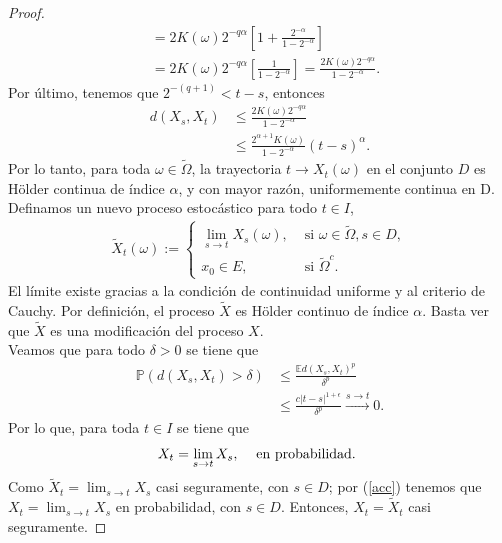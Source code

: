 \begin{proof}
\begin{align*}
	& = 2K(\omega) 2^{-q \alpha} \left[1 + \frac{2^{- \alpha}}{1 - 2^{- \alpha}} \right] \\
	& = 2K(\omega) 2^{-q \alpha} \left[ \frac{1}{1 - 2^{- \alpha}} \right] = \frac{2K(\omega) 2^{-q \alpha}}{1 - 2^{- \alpha}}.
	\end{align*}
Por último, tenemos que $2^{-(q+1)} < t-s$, entonces
	\begin{align*}
	d(X_s, X_t) & \leq \frac{2K(\omega) 2^{-q \alpha}}{1 - 2^{- \alpha}} \\
	& \leq \frac{2^{\alpha + 1}K(\omega)}{1 - 2^{- \alpha}} (t - s)^{\alpha}.
	\end{align*}
Por lo tanto, para toda $\omega \in \tilde{\Omega}$, la trayectoria $t \rightarrow X_t (\omega)$ en el conjunto $D$ es Hölder continua de índice $\alpha$, y con mayor razón, uniformemente continua en D. \\

Definamos un nuevo proceso estocástico para todo $t \in I$, 
	\begin{align*}
	\tilde{X}_t (\omega) := 
		\begin{cases}
		\lim_{s \rightarrow t} X_s (\omega), & \text{ si } \omega \in \tilde{\Omega}, s \in D, \\
		x_0 \in E, & \text{ si } \tilde{\Omega}^c .
		\end{cases}
	\end{align*}
El límite existe gracias a la condición de continuidad uniforme y al criterio de Cauchy. Por definición, el proceso $\tilde{X}$ es Hölder continuo de índice $\alpha$. Basta ver que $\tilde{X}$ es una modificación del proceso $X$. \\

Veamos que para todo $\delta > 0$ se tiene que
	\begin{align*}
	\mathbb{P} \left(d(X_s, X_t) > \delta \right) & \leq \frac{\mathbb{E} d(X_s, X_t)^p}{\delta^p} \\
	& \leq \frac{c|t-s|^{1+ \epsilon}}{\delta^p} \xrightarrow{s \rightarrow t} 0.
	\end{align*}
Por lo que, para toda $t \in I$ se tiene que
	\begin{align}
	X_t = \lim_{s \rightarrow t} X_s, \hspace{0.3cm} \text{ en probabilidad. } \label{acc}
	\end{align}
Como $\tilde{X}_t = \lim_{s \rightarrow t} X_s$ casi seguramente, con $s \in D$; por (\ref{acc}) tenemos que $X_t = \lim_{s \rightarrow t} X_s$ en probabilidad, con $s \in D$. Entonces, $X_t = \tilde{X}_t$ casi seguramente.
\end{proof}

